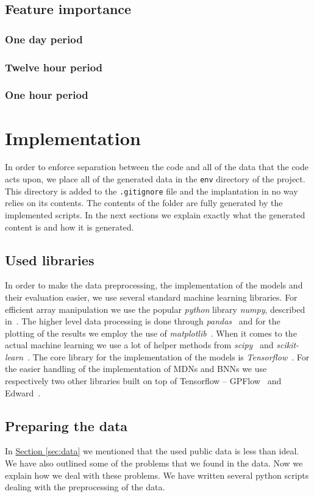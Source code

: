 \documentclass[12pt,a4paper,twoside]{scrartcl}
\numberwithin{equation}{section}
\newcommand{\refsec}[1]{\hyperref[#1]{Section \ref*{#1}}}
\begin{document}
\subsection{Feature importance}
\subsubsection{One day period}
\subsubsection{Twelve hour period}
\subsubsection{One hour period}
\section{Implementation}\label{sec:impl}
In order to enforce separation between the code and all of the data that the code acts upon, we place all of the generated data in the \texttt{env} directory of the project. This directory is added to the \texttt{.gitignore} file and the implantation in no way relies on its contents. The contents of the folder are fully generated by the implemented scripts. In the next sections we explain exactly what the generated content is and how it is generated.
\subsection{Used libraries}\label{sec:libs}
In order to make the data preprocessing, the implementation of the models and their evaluation easier, we use several standard machine learning libraries. For efficient array manipulation we use the popular \emph{python} library \emph{numpy}, described in~\cite{numpy}. The higher level data processing is done through \emph{pandas}~\cite{pandas} and for the plotting of the results we employ the use of \emph{matplotlib}~\cite{matplotlib}. When it comes to the actual machine learning we use a lot of helper methods from \emph{scipy}~\cite{scipy} and \emph{scikit-learn}~\cite{scikit-learn}. The core library for the implementation of the models is \emph{Tensorflow}~\cite{tf}. For the easier handling of the implementation of MDNs and BNNs we use respectively two other libraries built on top of Tensorflow -- GPFlow~\cite{gpflow} and Edward~\cite{edward}. 
\subsection{Preparing the data}\label{sec:prep-data}
In \refsec{sec:data} we mentioned that the used public data is less than ideal. We have also outlined some of the problems that we found in the data. Now we explain how we deal with these problems. We have written several python scripts dealing with the preprocessing of the data. 
\end{document}
